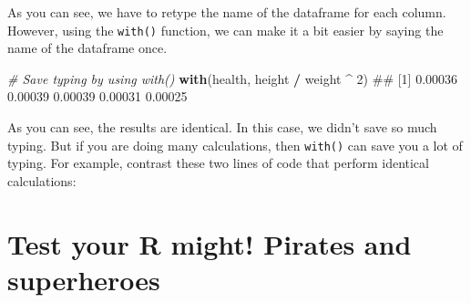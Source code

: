 \documentclass[]{book}
\newenvironment{Shaded}{\begin{snugshade}}{\end{snugshade}}
\newcommand{\KeywordTok}[1]{\textcolor[rgb]{0.13,0.29,0.53}{\textbf{#1}}}
\newcommand{\DecValTok}[1]{\textcolor[rgb]{0.00,0.00,0.81}{#1}}
\newcommand{\StringTok}[1]{\textcolor[rgb]{0.31,0.60,0.02}{#1}}
\newcommand{\CommentTok}[1]{\textcolor[rgb]{0.56,0.35,0.01}{\textit{#1}}}
\newcommand{\OperatorTok}[1]{\textcolor[rgb]{0.81,0.36,0.00}{\textbf{#1}}}
\newcommand{\NormalTok}[1]{#1}
\theoremstyle{definition}
\theoremstyle{definition}
\theoremstyle{remark}
\begin{document}
As you can see, we have to retype the name of the dataframe for each
column. However, using the \texttt{with()} function, we can make it a
bit easier by saying the name of the dataframe once.

\begin{Shaded}
\begin{Highlighting}[]
\CommentTok{# Save typing by using with()}
\KeywordTok{with}\NormalTok{(health, height }\OperatorTok{/}\StringTok{ }\NormalTok{weight }\OperatorTok{^}\StringTok{ }\DecValTok{2}\NormalTok{)}
\NormalTok{## [1] 0.00036 0.00039 0.00039 0.00031 0.00025}
\end{Highlighting}
\end{Shaded}

As you can see, the results are identical. In this case, we didn't save
so much typing. But if you are doing many calculations, then
\texttt{with()} can save you a lot of typing. For example, contrast
these two lines of code that perform identical calculations:

\begin{Shaded}
\end{Shaded}

\section{Test your R might! Pirates and
superheroes}\label{test-your-r-might-pirates-and-superheroes}
\end{document}
